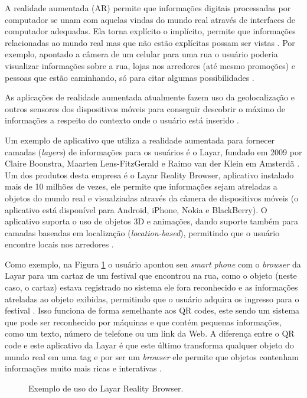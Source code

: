 \documentclass[diss]{template/setrem}
\begin{document}
A realidade aumentada (AR) permite que informações digitais processadas por computador se unam com aquelas vindas do mundo real através de interfaces de computador adequadas. Ela torna explícito o implícito, permite que informações relacionadas ao mundo real mas que não estão explícitas possam ser vistas \citep{InglobeTechnologies2012}. Por exemplo, apontado a câmera de um celular para uma rua o usuário poderia visualizar informações sobre a rua, lojas nos arredores (até mesmo promoções) e pessoas que estão caminhando, só para citar algumas possibilidades \citep{Holdener2011}.

As aplicações de realidade aumentada atualmente fazem uso da geolocalização e outros sensores dos dispositivos móveis para conseguir descobrir o máximo de informações a respeito do contexto onde o usuário está inserido \citep{Holdener2011}.

Um exemplo de aplicativo que utiliza a realidade aumentada para fornecer camadas (\emph{layers}) de informações para os usuários é o Layar, fundado em 2009 por Claire Boonstra, Maarten Lens-FitzGerald e Raimo van der Klein em Amsterdã \citep{Holdener2011}. Um dos produtos desta empresa é o Layar Reality Browser, aplicativo instalado mais de 10 milhões de vezes, ele permite que informações sejam atreladas a objetos do mundo real e visualziadas através da câmera de dispositivos móveis (o aplicativo está disponível para Android, iPhone, Nokia e BlackBerry). O aplicativo suporta o uso de objetos 3D e animações, dando suporte também para camadas baseadas em localização (\emph{location-based}), permitindo que o usuário encontre locais nos arredores \citep{Layar2012}.

Como exemplo, na Figura \ref{fig:layar} o usuário apontou seu \emph{smart phone} com o \emph{browser} da Layar para um cartaz de um festival que encontrou na rua, como o objeto (neste caso, o cartaz) estava registrado no sistema ele fora reconhecido e as informações atreladas ao objeto exibidas, permitindo que o usuário adquira os ingresso para o festival \citep{Layar2012}. Isso funciona de forma semelhante aos QR codes, este sendo um sistema que pode ser reconhecido por máquinas e que contém pequenas informações, como um texto, número de telefone ou um link da Web. A diferença entre o QR code e este aplicativo da Layar é que este último transforma qualquer objeto do mundo real em uma tag e por ser um \emph{browser} ele permite que objetos contenham informações muito mais ricas e interativas \citep{Eaton2011}.

\begin{figure}[!h]
    \caption{Exemplo de uso do Layar Reality Browser.}
    \label{fig:layar}
\end{figure}
\end{document}
